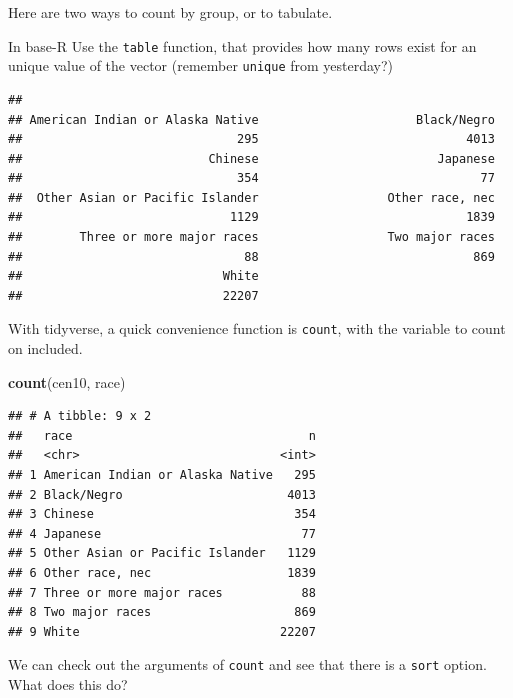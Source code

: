 \documentclass[]{book}
\newenvironment{Shaded}{\begin{snugshade}}{\end{snugshade}}
\newcommand{\KeywordTok}[1]{\textcolor[rgb]{0.13,0.29,0.53}{\textbf{#1}}}
\newcommand{\NormalTok}[1]{#1}
\newcommand{\OperatorTok}[1]{\textcolor[rgb]{0.81,0.36,0.00}{\textbf{#1}}}
\theoremstyle{definition}
\theoremstyle{definition}
\theoremstyle{definition}
\theoremstyle{remark}
\begin{document}
\begin{Shaded}
\begin{Highlighting}[]
\begin{Shaded}
\begin{Highlighting}[]
Here are two ways to count by group, or to tabulate.

In base-R Use the \texttt{table} function, that provides how many rows exist for an unique value of the vector (remember \texttt{unique} from yesterday?)

\begin{Shaded}
\end{Shaded}

\begin{verbatim}
## 
## American Indian or Alaska Native                      Black/Negro 
##                              295                             4013 
##                          Chinese                         Japanese 
##                              354                               77 
##  Other Asian or Pacific Islander                  Other race, nec 
##                             1129                             1839 
##        Three or more major races                  Two major races 
##                               88                              869 
##                            White 
##                            22207
\end{verbatim}

With tidyverse, a quick convenience function is \texttt{count}, with the variable to count on included.

\begin{Shaded}
\begin{Highlighting}[]
\KeywordTok{count}\NormalTok{(cen10, race)}
\end{Highlighting}
\end{Shaded}

\begin{verbatim}
## # A tibble: 9 x 2
##   race                                 n
##   <chr>                            <int>
## 1 American Indian or Alaska Native   295
## 2 Black/Negro                       4013
## 3 Chinese                            354
## 4 Japanese                            77
## 5 Other Asian or Pacific Islander   1129
## 6 Other race, nec                   1839
## 7 Three or more major races           88
## 8 Two major races                    869
## 9 White                            22207
\end{verbatim}

We can check out the arguments of \texttt{count} and see that there is a \texttt{sort} option. What does this do?


\end{Highlighting}
\end{Shaded}
\end{Highlighting}
\end{Shaded}
\end{document}
